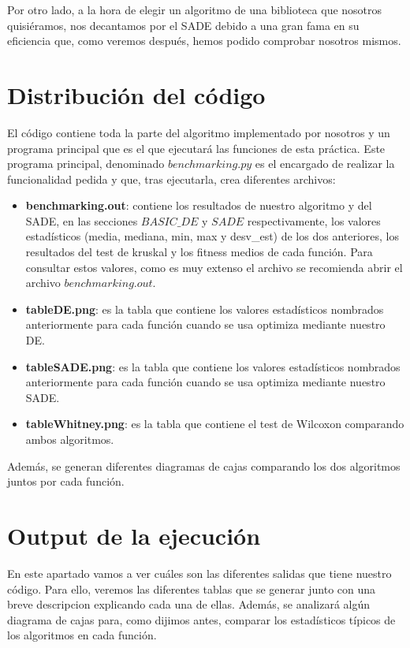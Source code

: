 \documentclass[11pt, a4paper, titlepage]{article}
\begin{document}
\vspace{5mm}

Por otro lado, a la hora de elegir un algoritmo de una biblioteca que nosotros quisiéramos, nos decantamos por el SADE debido a una gran fama en su eficiencia que, como veremos después, hemos podido comprobar nosotros mismos.

\newpage

\section{Distribución del código}
El código contiene toda la parte del algoritmo implementado por nosotros y un programa principal que es el que ejecutará las funciones de esta práctica. Este programa principal, denominado $benchmarking.py$ es el encargado de realizar la funcionalidad pedida y que, tras ejecutarla, crea diferentes archivos:

\begin{itemize}
\item \textbf{benchmarking.out}: contiene los resultados de nuestro algoritmo y del SADE, en las secciones $BASIC\_DE$ y $SADE$ respectivamente, los valores estadísticos (media, mediana, min, max y desv\_est) de los dos anteriores, los resultados del test de kruskal y los fitness medios de cada función. Para consultar estos valores, como es muy extenso el archivo se recomienda abrir el archivo $benchmarking.out$.
\item \textbf{tableDE.png}: es la tabla que contiene los valores estadísticos nombrados anteriormente para cada función cuando se usa optimiza mediante nuestro DE.
\item \textbf{tableSADE.png}: es la tabla que contiene los valores estadísticos nombrados anteriormente para cada función cuando se usa optimiza mediante nuestro SADE.
\item \textbf{tableWhitney.png}: es la tabla que contiene el test de Wilcoxon comparando ambos algoritmos.
\end{itemize}
Además, se generan diferentes diagramas de cajas comparando los dos algoritmos juntos por cada función.

\newpage

\section{Output de la ejecución}
En este apartado vamos a ver cuáles son las diferentes salidas que tiene nuestro código. Para ello, veremos las diferentes tablas que se generar junto con una breve descripcion explicando cada una de ellas. Además, se analizará
algún diagrama de cajas para, como dijimos antes, comparar los estadísticos típicos de los algoritmos en cada función.
\end{document}
